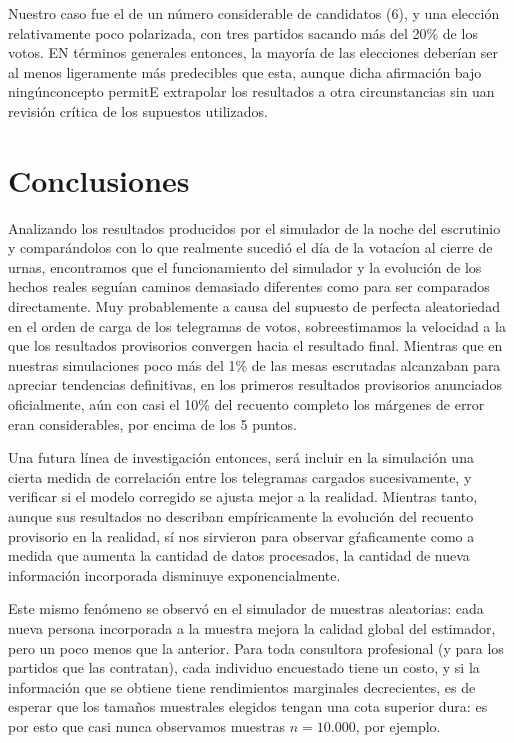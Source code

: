 \documentclass[12pt, a4paper]{article}
\begin{document}
Nuestro caso fue el de un n\'umero considerable de candidatos (6), y una elecci\'on relativamente poco polarizada, con tres partidos sacando m\'as del 20\% de los votos. EN t\'erminos generales entonces, la mayor\'ia de las elecciones deber\'ian ser al menos ligeramente m\'as predecibles que esta, aunque dicha afirmaci\'on bajo ning\'unconcepto permitE extrapolar los resultados a otra circunstancias sin uan revisi\'on cr\'itica de los supuestos utilizados.

\section{Conclusiones}

Analizando los resultados producidos por el simulador de la noche del escrutinio y compar\'andolos con lo que realmente sucedi\'o el d\'ia de la votac\'ion al cierre de urnas, encontramos que el funcionamiento del simulador y la evoluci\'on de los hechos reales segu\'ian caminos demasiado diferentes como para ser comparados directamente.
Muy probablemente a causa del supuesto de perfecta aleatoriedad en el orden de carga de los telegramas de votos, sobreestimamos la velocidad a la que los resultados provisorios convergen hacia el resultado final. Mientras que en nuestras simulaciones poco m\'as del 1\% de las mesas escrutadas alcanzaban para apreciar tendencias definitivas, en los primeros resultados provisorios anunciados oficialmente, a\'un con casi el 10\% del recuento completo los m\'argenes de error eran considerables, por encima de los 5 puntos.

Una futura l\'inea de investigaci\'on entonces, ser\'a incluir en la simulaci\'on una cierta medida de correlaci\'on entre los telegramas cargados sucesivamente, y verificar si el modelo corregido se ajusta mejor a la realidad. Mientras tanto, aunque sus resultados no describan emp\'iricamente la evoluci\'on del recuento provisorio en la realidad, s\'i nos sirvieron para observar g\'raficamente como a medida que aumenta la cantidad de datos procesados, la cantidad de nueva informaci\'on incorporada disminuye exponencialmente.

Este mismo fen\'omeno se observ\'o en el simulador de muestras aleatorias: cada nueva persona incorporada a la muestra mejora la calidad global del estimador, pero un poco menos que la anterior. Para toda consultora profesional (y para los partidos que las contratan), cada individuo encuestado tiene un costo, y si la informaci\'on que se obtiene tiene rendimientos marginales decrecientes, es de esperar que los tama\~nos muestrales elegidos tengan una cota superior dura: es por esto que casi nunca observamos muestras $n=10.000$, por ejemplo.
\end{document}
